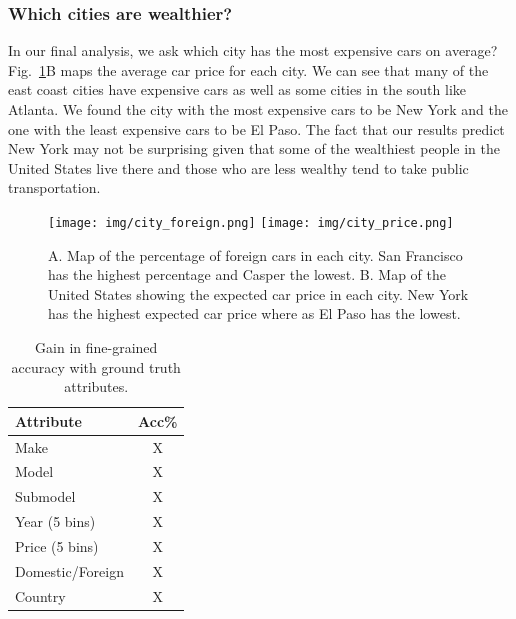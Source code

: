 \documentclass[10pt,twocolumn,letterpaper]{article}
\begin{document}
\subsubsection{Which cities are wealthier?}
In our final analysis, we ask which city has the most expensive cars on average? Fig.~\ref{fig:city_price}B maps the average car price for each city. We can see that many of the east coast cities have expensive cars as well as some cities in the south like Atlanta. We found the city with the most expensive cars to be New York and the one with the least expensive cars to be El Paso. The fact that our results predict New York may not be surprising given that some of the wealthiest people in the United States live there and those who are less wealthy tend to take public transportation.

\begin{figure}[t]
\begin{center}
    \texttt{[image: img/city\_foreign.png]}
    \texttt{[image: img/city\_price.png]}
\end{center}
   \caption {A. Map of the percentage of foreign cars in each city. San Francisco has the highest percentage and Casper the lowest. B. Map of the United States showing the expected car price in each city. New York has the highest expected car price where as El Paso has the lowest.}
\label{fig:city_price}
\end{figure}

\begin{table}
\begin{center}
\begin{tabular}{|l|c|}
\hline
\textbf{Attribute} & \textbf{Acc\%} \\
\hline\hline
Make & X \\
Model & X \\
Submodel & X \\
Year (5 bins) & X \\
Price (5 bins)& X \\
Domestic/Foreign & X\\
Country & X\\
\hline
\end{tabular}
\end{center}
\caption{Gain in fine-grained accuracy with ground truth attributes.}
\label{table:ground}
\end{table}
\end{document}
